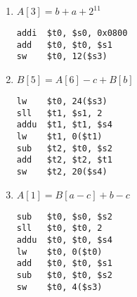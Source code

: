 \documentclass[12pt,letterpaper,titlepage]{article}
\begin{document}
\begin{raggedright}
\begin{enumerate}
\item $A[3] = b + a + 2^{11}$
\begin{lstlisting}
addi  $t0, $s0, 0x0800
add   $t0, $t0, $s1
sw    $t0, 12($s3)
\end{lstlisting}

\item $B[5] = A[6] - c + B[b]$
\begin{lstlisting}
lw    $t0, 24($s3)
sll   $t1, $s1, 2
addu  $t1, $t1, $s4
lw    $t1, 0($t1)
sub   $t2, $t0, $s2
add   $t2, $t2, $t1
sw    $t2, 20($s4)
\end{lstlisting}

\item $A[1] = B[a - c] + b - c$
\begin{lstlisting}
sub   $t0, $s0, $s2
sll   $t0, $t0, 2
addu  $t0, $t0, $s4
lw    $t0, 0($t0)
add   $t0, $t0, $s1
sub   $t0, $t0, $s2
sw    $t0, 4($s3)
\end{lstlisting}

\end{enumerate}

\end{raggedright}
\end{document}
